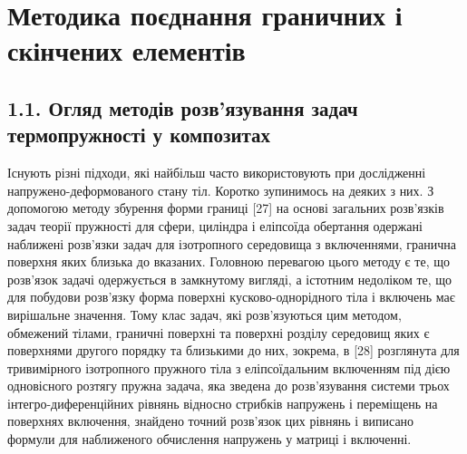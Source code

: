 \hypertarget{ux43cux435ux442ux43eux434ux438ux43aux430-ux43fux43eux454ux434ux43dux430ux43dux43dux44f-ux433ux440ux430ux43dux438ux447ux43dux438ux445-ux456-ux441ux43aux456ux43dux447ux435ux43dux438ux445-ux435ux43bux435ux43cux435ux43dux442ux456ux432}{%
\section{\texorpdfstring{Методика поєднання граничних і скінчених
елементів
}{Методика поєднання граничних і скінчених елементів }}\label{ux43cux435ux442ux43eux434ux438ux43aux430-ux43fux43eux454ux434ux43dux430ux43dux43dux44f-ux433ux440ux430ux43dux438ux447ux43dux438ux445-ux456-ux441ux43aux456ux43dux447ux435ux43dux438ux445-ux435ux43bux435ux43cux435ux43dux442ux456ux432}}

\hypertarget{ux43eux433ux43bux44fux434-ux43cux435ux442ux43eux434ux456ux432-ux440ux43eux437ux432ux44fux437ux443ux432ux430ux43dux43dux44f-ux437ux430ux434ux430ux447-ux442ux435ux440ux43cux43eux43fux440ux443ux436ux43dux43eux441ux442ux456-ux443-ux43aux43eux43cux43fux43eux437ux438ux442ux430ux445}{%
\subsection{1.1. Огляд методів розв'язування задач термопружності у
композитах}\label{ux43eux433ux43bux44fux434-ux43cux435ux442ux43eux434ux456ux432-ux440ux43eux437ux432ux44fux437ux443ux432ux430ux43dux43dux44f-ux437ux430ux434ux430ux447-ux442ux435ux440ux43cux43eux43fux440ux443ux436ux43dux43eux441ux442ux456-ux443-ux43aux43eux43cux43fux43eux437ux438ux442ux430ux445}}

\protect\hypertarget{_Toc148277847}{}{}Існують різні підходи, які
найбільш часто використовують при дослідженні напружено-деформованого
стану тіл. Коротко зупинимось на деяких з них. З допомогою методу
збурення форми границі {[}27{]} на основі загальних розв'язків задач
теорії пружності для сфери, циліндра і еліпсоїда обертання одержані
наближені розв'язки задач для ізотропного середовища з включеннями,
гранична поверхня яких близька до вказаних. Головною перевагою цього
методу є те, що розв'язок задачі одержується в замкнутому вигляді, а
істотним недоліком те, що для побудови розв'язку форма поверхні
кусково-однорідного тіла і включень має вирішальне значення. Тому клас
задач, які розв'язуються цим методом, обмежений тілами, граничні
поверхні та поверхні розділу середовищ яких є поверхнями другого порядку
та близькими до них, зокрема, в {[}28{]} розглянута для тривимірного
ізотропного пружного тіла з еліпсоїдальним включенням під дією
одновісного розтягу пружна задача, яка зведена до розв'язування системи
трьох інтегро-диференційних рівнянь відносно стрибків напружень і
переміщень на поверхнях включення, знайдено точний розв'язок цих рівнянь
і виписано формули для наближеного обчислення напружень у матриці і
включенні.

